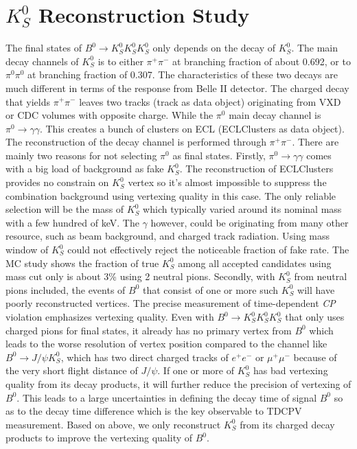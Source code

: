 \chapter{$K_S^0$ Reconstruction Study}



The final states of $B^0 \to K_S^0  K_S^0  K_S^0 $ only depends on the decay of $K_S^0$. The main decay channels of $K_S^0$ is to either $\pi^+ \pi^-$ at branching fraction of about 0.692, or to $\pi^0 \pi^0$ at branching fraction of 0.307. The characteristics of these two decays are much different in terms of the response from Belle II detector. The charged decay that yields  $\pi^+ \pi^-$ leaves two tracks (track as data object) originating from VXD or CDC volumes with opposite charge. While the $\pi^0$ main decay channel is $\pi^0 \to \gamma \gamma$. This creates a bunch of clusters on ECL (ECLClusters as data object). The reconstruction of the decay channel is performed through  $\pi^+ \pi^-$. There are mainly two reasons for not selecting $\pi^0$ as final states.
 Firstly, $\pi^0 \to \gamma \gamma$ comes with a big load of background as fake $K_S^0$. The reconstruction of ECLClusters provides no constrain on $K_S^0$ vertex so it's almost impossible to suppress the combination background using vertexing quality in this case. The only reliable selection will be the mass of $K_S^0$ which typically varied around its nominal mass with a few hundred of keV. 
 The $\gamma$ however, could be originating from many other resource, such as beam background, and charged track radiation. Using mass window of $K_S^0$ could not effectively reject the noticeable fraction of fake rate. The MC study shows the fraction of true $K_S^0$ among all accepted candidates using mass cut only is about 3\% using 2 neutral pions.  Secondly, with $K_S^0$ from neutral pions  included, the events of $B^0$ that consist of one or more such $K_S^0$ will have poorly reconstructed vertices. The precise measurement of time-dependent \textit{CP} violation emphasizes vertexing quality. Even with $B^0 \to K_S^0  K_S^0  K_S^0 $ that only uses charged pions for final states, it already has no primary vertex from $B^0$ which leads to the worse resolution of vertex position compared to the channel like $B^0 \to J/\psi K_S^0$, which has two direct charged tracks of $e^+e^-$ or $\mu^+ \mu^-$  because of the very short flight distance of $J/\psi$. If one or more of $K^0_S$ has bad vertexing quality from its decay products, it will further reduce the precision of vertexing of $B^0$. This leads to a large uncertainties in defining the decay time of signal $B^0$ so as to the decay time difference which is the key observable to TDCPV measurement. Based on above, we only reconstruct $K_S^0$ from its charged decay products to improve the vertexing quality of $B^0$.
 
